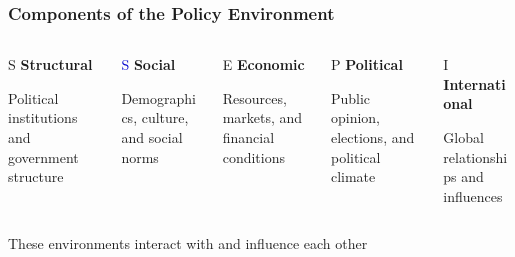 \documentclass[10pt]{beamer}
\begin{document}
\begin{frame}
\frametitle{Components of the Policy Environment}

\begin{columns}
\begin{column}{0.18\textwidth}
\begin{block}{\textcolor{titanblue}{S}}
\pause
\centering
\textbf{Structural}

Political institutions and government structure
\end{block}
\end{column}

\begin{column}{0.18\textwidth}
\begin{block}{\textcolor{mediumblue}{S}}
\pause
\centering
\textbf{Social}

Demographics, culture, and social norms
\end{block}
\end{column}

\begin{column}{0.18\textwidth}
\begin{block}{\textcolor{successcolor}{E}}
\pause
\centering
\textbf{Economic}

Resources, markets, and financial conditions
\end{block}
\end{column}

\begin{column}{0.18\textwidth}
\begin{block}{\textcolor{warningcolor}{P}}
\pause
\centering
\textbf{Political}

Public opinion, elections, and political climate
\end{block}
\end{column}

\begin{column}{0.18\textwidth}
\begin{block}{\textcolor{dangercolor}{I}}
\pause
\centering
\textbf{International}

Global relationships and influences
\end{block}
\end{column}
\end{columns}

\pause
\vspace{0.5cm}
\centering
These environments interact with and influence each other

\end{frame}
\end{document}
